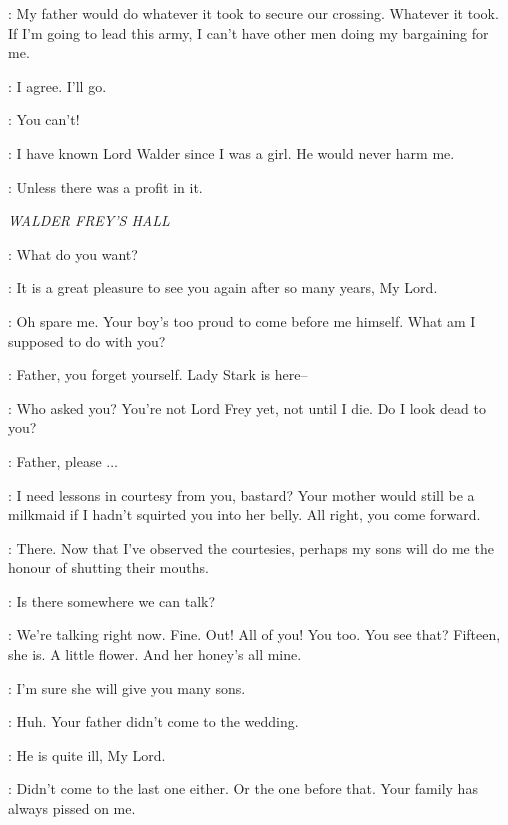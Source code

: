 \ROBB: My father would do whatever it took to secure our crossing. Whatever it took. If I'm going to lead this army, I can't have other men doing my bargaining for me. 

\CATELYN: I agree. I'll go. 

\THEON: You can't! 

\CATELYN: I have known Lord Walder since I was a girl. He would never harm me. 

\UMBER: Unless there was a profit in it. 


\scene

\textit{WALDER FREY'S HALL} 


\FREY: What do you want? 

\CATELYN: It is a great pleasure to see you again after so many years, My Lord. 

\FREY: Oh spare me. Your boy's too proud to come before me himself. What am I supposed to do with you? 

\STEVRONFREY: Father, you forget yourself. Lady Stark is here-- 

\FREY: Who asked you? You're not Lord Frey yet, not until I die. Do I look dead to you? 

\WALDERRIVERS: Father, please $\ldots$  

\FREY: I need lessons in courtesy from you, bastard? Your mother would still be a milkmaid if I hadn't squirted you into her belly. All right, you come forward. 


\FREY: There. Now that I've observed the courtesies, perhaps my sons will do me the honour of shutting their mouths. 

\CATELYN: Is there somewhere we can talk? 

\FREY: We're talking right now.  Fine. Out! All of you!  You too.  You see that? Fifteen, she is. A little flower. And her honey's all mine. 

\CATELYN: I'm sure she will give you many sons. 

\FREY: Huh. Your father didn't come to the wedding. 

\CATELYN: He is quite ill, My Lord. 

\FREY: Didn't come to the last one either. Or the one before that. Your family has always pissed on me. 

